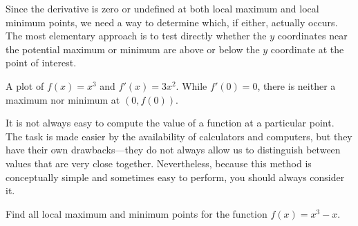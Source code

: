 Since the derivative is zero or undefined at both local maximum and
local minimum points, we need a way to determine which, if either,
actually occurs. The most elementary approach is to test directly
whether the $y$ coordinates near the potential maximum or minimum are
above or below the $y$ coordinate at the point of interest. 
\begin{marginfigure}[0in]
\caption{A plot of $f(x) = x^3$ and $f'(x) = 3x^2$. While $f'(0)=0$,
  there is neither a maximum nor minimum at $(0,f(0))$.}
\label{figure:x^3}
\end{marginfigure}

It is not always easy to compute the value of a function at a
particular point. The task is made easier by the availability of
calculators and computers, but they have their own drawbacks---they do
not always allow us to distinguish between values that are very close
together. Nevertheless, because this method is conceptually simple and
sometimes easy to perform, you should always consider it.

\begin{example}
Find all local maximum and minimum points for the function 
$f(x)=x^3-x$. 
\end{example}

